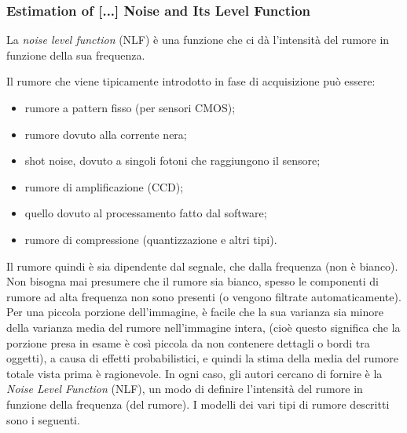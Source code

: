 \documentclass[a4paper,11pt]{article}
\begin{document}
\subsubsection{Estimation of [...] Noise and Its Level Function}
La \textit{noise level function} (NLF) è una funzione che ci dà l'intensità del rumore in funzione della sua frequenza.
\par
Il rumore che viene tipicamente introdotto in fase di acquisizione può essere:
\begin{itemize}
    \item rumore a pattern fisso (per sensori CMOS);
    \item rumore dovuto alla corrente nera;
    \item shot noise, dovuto a singoli fotoni che raggiungono il sensore;
    \item rumore di amplificazione (CCD);
    \item quello dovuto al processamento fatto dal software;
    \item rumore di compressione (quantizzazione e altri tipi).
\end{itemize}
Il rumore quindi è sia dipendente dal segnale, che dalla frequenza (non è bianco). Non bisogna mai presumere che il rumore sia bianco,
spesso le componenti di rumore ad alta frequenza non sono presenti (o vengono filtrate automaticamente).
Per una piccola porzione dell'immagine, è facile che la sua varianza sia minore della varianza media del rumore nell'immagine intera,
(cioè questo significa che la porzione presa in esame è così piccola da non contenere dettagli o bordi tra oggetti),
a causa di effetti probabilistici, e quindi la stima della media del rumore totale vista prima è ragionevole.
In ogni caso, gli autori cercano di fornire è la \textit{Noise Level Function} (NLF), un modo di definire l'intensità del rumore in funzione della frequenza
(del rumore). I modelli dei vari tipi di rumore descritti sono i seguenti.
\end{document}
